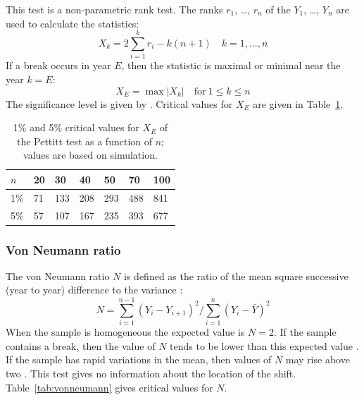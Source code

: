\documentclass[a4paper,11pt]{article}
\begin{document}
This test is a non-parametric rank test. The ranks $r_1$, \dots, $r_n$
of the $Y_1$, \ldots, $Y_n$ are used to calculate the statistics:
\begin{equation*}
X_k = 2 \sum_{i=1}^{k} r_i - k(n+1) \quad k = 1, \ldots, n
\end{equation*}
If a break occurs in year $E$, then the statistic is maximal or minimal near the year $k=E$:
\begin{equation*}
X_E = \max \vert X_k \vert  \quad \mathrm{for}\: 1 \leq k \leq n 
\end{equation*}
The significance level is given by \citet{pettitt}. Critical values
for $X_E$ are given in Table~\ref{tab:pettitt}.

\begin{table}[!ht]
\begin{center}
\caption{1\% and 5\% critical values for $X_E$ of the Pettitt test as
a function of $n$; values are based on simulation.}
\label{tab:pettitt}
\begin{tabular}{l l l l l l l}
\hline
$n$ & 20 & 30 & 40 & 50 & 70 & 100\\
\hline
1\% & 71 & 133 & 208 & 293 & 488 & 841 \\
5\% & 57 & 107 & 167 & 235 & 393 & 677 \\
\end{tabular}
\end{center}
\end{table}


\subsubsection{Von Neumann ratio}
\label{sec:neu}

The von Neumann ratio $N$ is defined as the ratio of the mean square
successive (year to year) difference to the variance
\citep{vonneumann}:
\begin{equation*}
N = \sum_{i=1}^{n-1}(Y_i - Y_{i+1})^2 / \sum_{i=1}^{n}(Y_i - \bar{Y})^2
\end{equation*}
When the sample is homogeneous the expected value is $N=2$. If the
sample contains a break, then the value of $N$ tends to be lower than
this expected value \citep{buishand1981}. If the sample has rapid
variations in the mean, then values of $N$ may rise above two
\citep{bingham}. This test gives no information about the location of
the shift. Table~\ref{tab:vonneumann} gives critical values for $N$.
\end{document}
